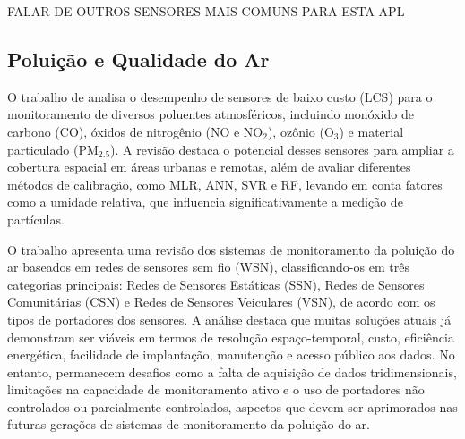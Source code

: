 FALAR DE OUTROS SENSORES MAIS COMUNS PARA ESTA APL

\subsection{Poluição e Qualidade do Ar}
O trabalho de \textcite{karagulian_2019_review} analisa o desempenho de sensores de baixo custo (LCS) para o monitoramento de diversos poluentes atmosféricos, incluindo monóxido de carbono (CO), óxidos de nitrogênio (NO e NO$_2$), ozônio (O$_3$) e material particulado (PM$_{2.5}$). A revisão destaca o potencial desses sensores para ampliar a cobertura espacial em áreas urbanas e remotas, além de avaliar diferentes métodos de calibração, como MLR, ANN, SVR e RF, levando em conta fatores como a umidade relativa, que influencia significativamente a medição de partículas.

O trabalho \textcite{yi_2015_a} apresenta uma revisão dos sistemas de monitoramento da poluição do ar baseados em redes de sensores sem fio (WSN), classificando-os em três categorias principais: Redes de Sensores Estáticas (SSN), Redes de Sensores Comunitárias (CSN) e Redes de Sensores Veiculares (VSN), de acordo com os tipos de portadores dos sensores. A análise destaca que muitas soluções atuais já demonstram ser viáveis em termos de resolução espaço-temporal, custo, eficiência energética, facilidade de implantação, manutenção e acesso público aos dados. No entanto, permanecem desafios como a falta de aquisição de dados tridimensionais, limitações na capacidade de monitoramento ativo e o uso de portadores não controlados ou parcialmente controlados, aspectos que devem ser aprimorados nas futuras gerações de sistemas de monitoramento da poluição do ar.
